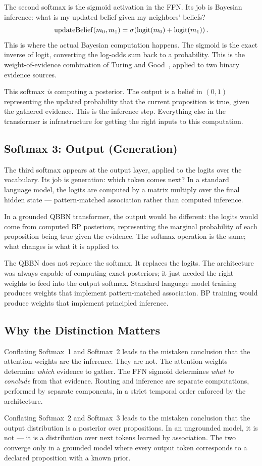 The second softmax is the sigmoid activation in the FFN. Its job is Bayesian
inference: what is my updated belief given my neighbors' beliefs?
\[
\mathrm{updateBelief}(m_0, m_1) = \sigma\!\left(\operatorname{logit}(m_0) + \operatorname{logit}(m_1)\right).
\]
This is where the actual Bayesian computation happens. The sigmoid is the exact
inverse of logit, converting the log-odds sum back to a probability. This is the
weight-of-evidence combination of Turing and Good~\cite{good1950probability},
applied to two binary evidence sources.

This softmax \emph{is} computing a posterior. The output is a belief in $(0,1)$
representing the updated probability that the current proposition is true, given
the gathered evidence. This is the inference step. Everything else in the
transformer is infrastructure for getting the right inputs to this computation.

\subsection*{Softmax 3: Output (Generation)}

The third softmax appears at the output layer, applied to the logits over the
vocabulary. Its job is generation: which token comes next? In a standard language
model, the logits are computed by a matrix multiply over the final hidden state ---
pattern-matched association rather than computed inference.

In a grounded QBBN transformer, the output would be different: the logits would come
from computed BP posteriors, representing the marginal probability of each
proposition being true given the evidence. The softmax operation is the same; what
changes is what it is applied to.

The QBBN does not replace the softmax. It replaces the logits. The architecture was
always capable of computing exact posteriors; it just needed the right weights to
feed into the output softmax. Standard language model training produces weights that
implement pattern-matched association. BP training would produce weights that
implement principled inference.

\subsection*{Why the Distinction Matters}

Conflating Softmax~1 and Softmax~2 leads to the mistaken conclusion that the
attention weights are the inference. They are not. The attention weights determine
\emph{which} evidence to gather. The FFN sigmoid determines \emph{what to conclude}
from that evidence. Routing and inference are separate computations, performed by
separate components, in a strict temporal order enforced by the architecture.

Conflating Softmax~2 and Softmax~3 leads to the mistaken conclusion that the output
distribution is a posterior over propositions. In an ungrounded model, it is not ---
it is a distribution over next tokens learned by association. The two converge only
in a grounded model where every output token corresponds to a declared proposition
with a known prior.